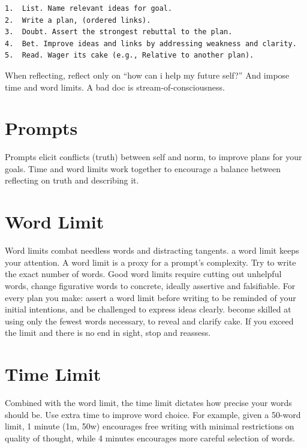 \documentclass[
]{book}
\begin{document}
\begin{verbatim}
1.  List. Name relevant ideas for goal.
2.  Write a plan, (ordered links).
3.  Doubt. Assert the strongest rebuttal to the plan.
4.  Bet. Improve ideas and links by addressing weakness and clarity.
5.  Read. Wager its cake (e.g., Relative to another plan).
\end{verbatim}

When reflecting, reflect only on ``how can i help my future self?'' And impose time and word limits.
A bad doc is stream-of-consciousness.

\hypertarget{prompts}{%
\section{Prompts}\label{prompts}}

Prompts elicit conflicts (truth) between self and norm, to improve plans for your goals.
Time and word limits work together to encourage a balance between reflecting on truth and describing it.

\hypertarget{word-limit}{%
\section{Word Limit}\label{word-limit}}

Word limits combat needless words and distracting tangents. a word limit keeps your attention.
A word limit is a proxy for a prompt's complexity.
Try to write the exact number of words.
Good word limits require cutting out unhelpful words, change figurative words to concrete, ideally assertive and falsifiable.
For every plan you make: assert a word limit before writing to be reminded of your initial intentions, and be challenged to express ideas clearly. become skilled at using only the fewest words necessary, to reveal and clarify cake.
If you exceed the limit and there is no end in sight, stop and reassess.

\hypertarget{time-limit}{%
\section{Time Limit}\label{time-limit}}

Combined with the word limit, the time limit dictates how precise your words should be.
Use extra time to improve word choice.
For example, given a 50-word limit, 1 minute (1m, 50w) encourages free writing with minimal restrictions on quality of thought, while 4 minutes encourages more careful selection of words.
\end{document}
